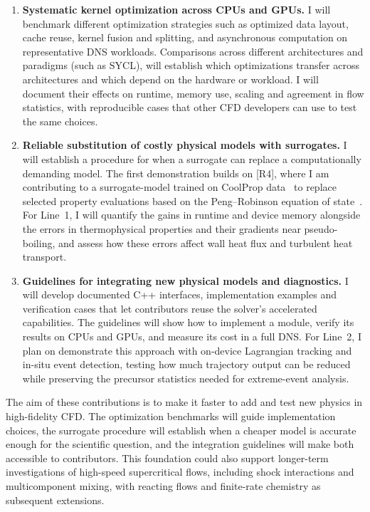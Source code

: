 \documentclass[11pt]{article}
\begin{document}
\begin{enumerate}
	\item \textbf{Systematic kernel optimization across CPUs and GPUs.}
	I will benchmark different optimization strategies such as optimized data layout, cache reuse, kernel fusion and splitting, and asynchronous computation on representative DNS workloads. Comparisons across different architectures and paradigms (such as SYCL), will establish which optimizations transfer across architectures and which depend on the hardware or workload. 
	I will document their effects on runtime, memory use, scaling and agreement in flow statistics, with reproducible cases that other CFD developers can use to test the same choices.
	
	\item \textbf{Reliable substitution of costly physical models with surrogates.}
	I will establish a procedure for when a surrogate can replace a computationally demanding model. The first demonstration builds on [R4], where I am contributing to a surrogate-model trained on CoolProp data~\cite{CoolProp2014} to replace selected property evaluations based on the Peng--Robinson equation of state~\cite{PengRobinson1976}. 
	For Line~1, I will quantify the gains in runtime and device memory alongside the errors in thermophysical properties and their gradients near pseudo-boiling, and assess how these errors affect wall heat flux and turbulent heat transport.
	
	\item \textbf{Guidelines for integrating new physical models and diagnostics.}
	I will develop documented C++ interfaces, implementation examples and verification cases that let contributors reuse the solver's accelerated capabilities. The guidelines will show how to implement a module, verify its results on CPUs and GPUs, and measure its cost in a full DNS. 
	For Line~2, I plan on demonstrate this approach with on-device Lagrangian tracking and in-situ event detection, testing how much trajectory output can be reduced while preserving the precursor statistics needed for extreme-event analysis.
\end{enumerate}
The aim of these contributions is to make it faster to add and test new physics in high-fidelity CFD. 
The optimization benchmarks will guide implementation choices, the surrogate procedure will establish when a cheaper model is accurate enough for the scientific question, and the integration guidelines will make both accessible to contributors. 
This foundation could also support longer-term investigations of high-speed supercritical flows, including shock interactions and multicomponent mixing, with reacting flows and finite-rate chemistry as subsequent extensions.
\end{document}
